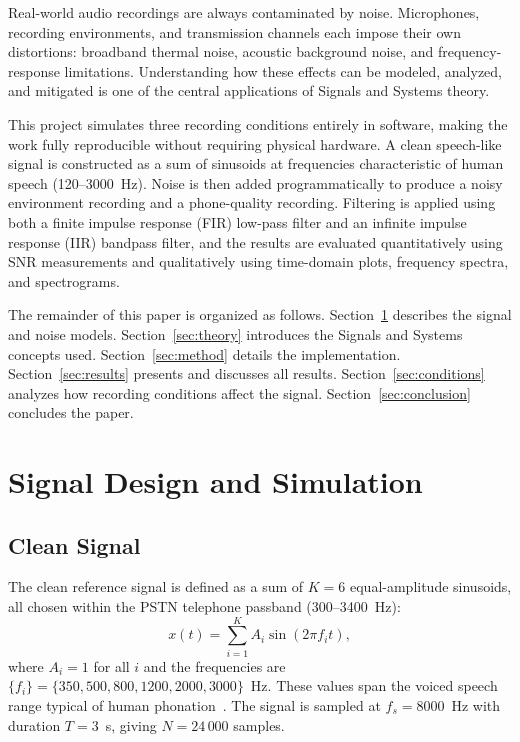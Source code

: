 \documentclass[journal]{IEEEtran}
\begin{document}
Real-world audio recordings are always contaminated by noise. Microphones,
recording environments, and transmission channels each impose their own
distortions: broadband thermal noise, acoustic background noise, and
frequency-response limitations. Understanding how these effects can be modeled,
analyzed, and mitigated is one of the central applications of Signals and Systems
theory.

This project simulates three recording conditions entirely in software, making
the work fully reproducible without requiring physical hardware. A clean
speech-like signal is constructed as a sum of sinusoids at frequencies
characteristic of human speech (120--3000~Hz). Noise is then added
programmatically to produce a noisy environment recording and a phone-quality
recording. Filtering is applied using both a finite impulse response (FIR)
low-pass filter and an infinite impulse response (IIR) bandpass filter, and the
results are evaluated quantitatively using SNR measurements and qualitatively
using time-domain plots, frequency spectra, and spectrograms.

The remainder of this paper is organized as follows. Section~\ref{sec:signal}
describes the signal and noise models. Section~\ref{sec:theory} introduces the
Signals and Systems concepts used. Section~\ref{sec:method} details the
implementation. Section~\ref{sec:results} presents and discusses all results.
Section~\ref{sec:conditions} analyzes how recording conditions affect the signal.
Section~\ref{sec:conclusion} concludes the paper.

\section{Signal Design and Simulation}
\label{sec:signal}

\subsection{Clean Signal}

The clean reference signal is defined as a sum of $K = 6$ equal-amplitude
sinusoids, all chosen within the PSTN telephone passband (300--3400~Hz):
\begin{equation}
  x(t) = \sum_{i=1}^{K} A_i \sin(2\pi f_i t),
  \label{eq:clean}
\end{equation}
where $A_i = 1$ for all $i$ and the frequencies are
$\{f_i\} = \{350, 500, 800, 1200, 2000, 3000\}$~Hz.
These values span the voiced speech range typical of human phonation~\cite{oppenheim2010}.
The signal is sampled at $f_s = 8000$~Hz with duration $T = 3$~s, giving
$N = 24\,000$ samples.
\end{document}
